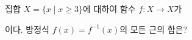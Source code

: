 집합 $X=\{x \mid x\ge 3\}$에 대하여 함수 $f:X\longrightarrow X$가\par\smallskip{}\par\smallskip\noindent 이다. 방정식 $f(x)=f^{-1}(x)$의 모든 근의 합은?

